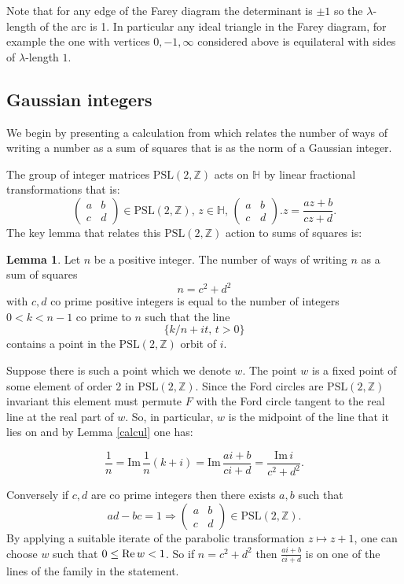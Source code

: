 \documentclass[12pt]{amsart}
\theoremstyle{plain}
\theoremstyle{definition}
\newtheorem{lem}[thm]{Lemma}
\def\HH{\mathbb{H}}
\def\im{\mathrm{Im}\,}
\def\ZZ{\mathbb{Z}}
\def\sl2{\mathrm{PSL}(2, \ZZ)}
\begin{document}
Note that for any edge of the Farey diagram the determinant is $\pm
1$ so the $\lambda$-length of the arc is 1. In particular any ideal
triangle in the Farey diagram, for example the one with vertices
$0,-1,\infty$ considered above is equilateral with sides of
$\lambda$-length $1$.


\subsection{Gaussian integers}

We begin by presenting a calculation from \cite{vlad}
which relates the number of ways of writing a number as a sum of
squares that is as the norm of a Gaussian integer.

The group of integer matrices $\sl2$  acts on $\HH$ by linear fractional transformations
that is:
$$\begin{pmatrix}
a & b \\
c & d
\end{pmatrix} \in \sl2,\, z\in \HH,\, 
\begin{pmatrix}
a & b \\
c & d
\end{pmatrix}. z = \frac{az + b}{cz + d}.
$$
The key lemma that relates this  $\sl2$ action to sums of squares is:

\begin{lem} \label{squares}
Let $n$ be a positive integer.
The number of  ways of writing $n$  as a  sum of squares
$$n = c^2 + d^2$$
with $c,d$ co prime positive  integers
is equal to the number of  integers $0 < k < n-1$ co prime to $n$
such that the line
$$\{  k/n + i t,\, t >0 \}$$
contains  a point in the $\sl2$  orbit of $i$.
\end{lem}


\proof  Suppose there is such  a point which we denote  $w$.
The point $w$ is a fixed point of some  element of order 2 in $\sl2$.
Since the Ford circles are $\sl2$ invariant
this element must permute $F$ with the Ford circle tangent 
to the real line  at the real part of $w$.
So, in particular, $w$ is the midpoint of the line 
that it lies on 
and by  Lemma \ref{calcul} one has:


\begin{equation}
\label{gaussian integers}
\frac{1}{n} = \im \frac{1 }{n}(k + i)  
= \im  \frac{ai +b}{ci+d }
= \frac{\im i} {c^2 + d^2}.
\end{equation}

Conversely if $c,d$ are co prime integers 
 then there exists $a,b$ such that
 $$ad - bc = 1 \Rightarrow  
 \begin{pmatrix}
 a & b \\
 c & d
 \end{pmatrix} \in \sl2.
$$
By applying a suitable iterate of the parabolic transformation 
$z \mapsto z + 1$,
one can choose $w$ such that $0 \leq \text{Re\,} w < 1$.
So if $n = c^2 + d^2$ then $\frac{ai +b}{ci+d }$
is on one of the lines of the family in the statement.
\end{document}
